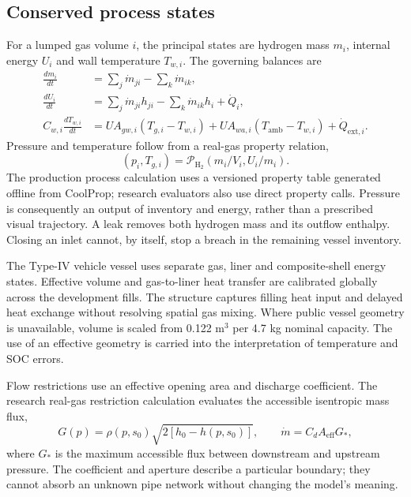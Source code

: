 \documentclass[12pt,a4paper]{article}
\begin{document}
\subsection{Conserved process states}
For a lumped gas volume $i$, the principal states are hydrogen mass $m_i$,
internal energy $U_i$ and wall temperature $T_{w,i}$. The governing balances are
\begin{align}
 \frac{dm_i}{dt} & = \sum_j \dot m_{ji}-\sum_k \dot m_{ik}, \\
 \frac{dU_i}{dt} & = \sum_j \dot m_{ji}h_{ji}
                  -\sum_k \dot m_{ik}h_i+\dot Q_i, \\
 C_{w,i}\frac{dT_{w,i}}{dt}
     & = UA_{gw,i}(T_{g,i}-T_{w,i})
       +UA_{wa,i}(T_{\mathrm{amb}}-T_{w,i})+\dot Q_{\mathrm{ext},i}.
\end{align}
Pressure and temperature follow from a real-gas property relation,
\begin{equation}
 (p_i,T_{g,i})=\mathcal P_{\mathrm H_2}
       \left(m_i/V_i,U_i/m_i\right).
\end{equation}
The production process calculation uses a versioned property table generated
offline from CoolProp; research evaluators also use direct property calls.
Pressure is consequently an output of inventory and energy, rather than a
prescribed visual trajectory. A leak removes both hydrogen mass and its
outflow enthalpy. Closing an inlet cannot, by itself, stop a breach in the
remaining vessel inventory.

The Type-IV vehicle vessel uses separate gas, liner and composite-shell energy
states. Effective volume and gas-to-liner heat transfer are calibrated globally
across the development fills. The structure captures filling heat input and
delayed heat exchange without resolving spatial gas mixing. Where public vessel
geometry is unavailable, volume is scaled from 0.122 m$^3$ per 4.7 kg nominal
capacity. The use of an effective geometry is carried into the interpretation of
temperature and SOC errors.

Flow restrictions use an effective opening area and discharge coefficient.
The research real-gas restriction calculation evaluates the accessible
isentropic mass flux,
\begin{equation}
 G(p)=\rho(p,s_0)\sqrt{2[h_0-h(p,s_0)]},\qquad
 \dot m=C_d A_{\mathrm{eff}}G_* ,
\end{equation}
where $G_*$ is the maximum accessible flux between downstream and upstream
pressure. The coefficient and aperture describe a particular boundary; they
cannot absorb an unknown pipe network without changing the model's meaning.
\end{document}
